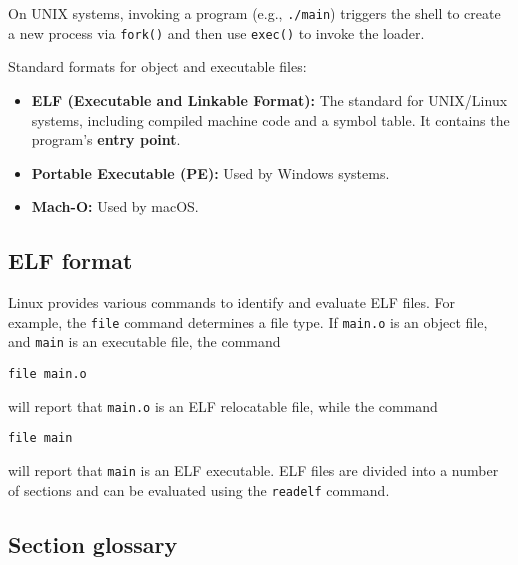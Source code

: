 On UNIX systems, invoking a program (e.g., \texttt{./main}) triggers the shell to create a new process via \texttt{fork()} and then use \texttt{exec()} to invoke the loader.

Standard formats for object and executable files:
\begin{itemize}
    \item \textbf{ELF (Executable and Linkable Format):} The standard for UNIX/Linux systems, including compiled machine code and a symbol table. It contains the program's \textbf{entry point}.
    \item \textbf{Portable Executable (PE):} Used by Windows systems.
    \item \textbf{Mach-O:} Used by macOS.
\end{itemize}

\subsection*{ELF format}

Linux provides various commands to identify and evaluate ELF files. For example, the \texttt{file} command determines a file type. If \texttt{main.o} is an object file, and \texttt{main} is an executable file, the command
\begin{verbatim}
file main.o
\end{verbatim}
will report that \texttt{main.o} is an ELF relocatable file, while the command
\begin{verbatim}
file main
\end{verbatim}
will report that \texttt{main} is an ELF executable. ELF files are divided into a number of sections and can be evaluated using the \texttt{readelf} command.

\subsection*{Section glossary}


